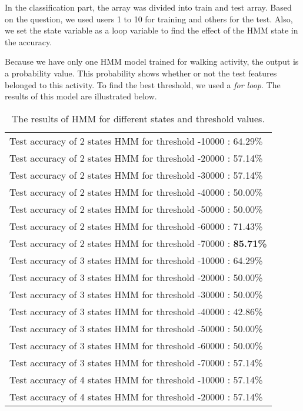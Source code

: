 In the classification part, the array was divided into train and test array. Based on the question, we used users 1 to 10 for training and others for the test. Also, we set the state variable as a loop variable to find the effect of the HMM state in the accuracy.

Because we have only one HMM model trained for walking activity, the output is a probability value. This probability shows whether or not the test features belonged to this activity. To find the best threshold, we used a \emph{for loop}. The results of this model are illustrated below.  


\begin{table}[H]
\centering
\caption{The results of HMM for different states and threshold values.}
\label{tab:Q2_results}
\begin{tabular}{l}
\toprule
    Test accuracy of 2 states HMM for threshold -10000 : $64.29\%$ \\
    Test accuracy of 2 states HMM for threshold -20000 : 57.14\% \\
    Test accuracy of 2 states HMM for threshold -30000 : 57.14\% \\
    Test accuracy of 2 states HMM for threshold -40000 : 50.00\% \\
    Test accuracy of 2 states HMM for threshold -50000 : 50.00\% \\
    Test accuracy of 2 states HMM for threshold -60000 : 71.43\% \\
    Test accuracy of 2 states HMM for threshold -70000 : \textbf{85.71\%}\\
    Test accuracy of 3 states HMM for threshold -10000 : 64.29\% \\
    Test accuracy of 3 states HMM for threshold -20000 : 50.00\% \\
    Test accuracy of 3 states HMM for threshold -30000 : 50.00\% \\
    Test accuracy of 3 states HMM for threshold -40000 : 42.86\% \\
    Test accuracy of 3 states HMM for threshold -50000 : 50.00\% \\
    Test accuracy of 3 states HMM for threshold -60000 : 50.00\% \\
    Test accuracy of 3 states HMM for threshold -70000 : 57.14\% \\
    Test accuracy of 4 states HMM for threshold -10000 : 57.14\% \\
    Test accuracy of 4 states HMM for threshold -20000 : 57.14\% \\

\end{tabular}
\end{table}

